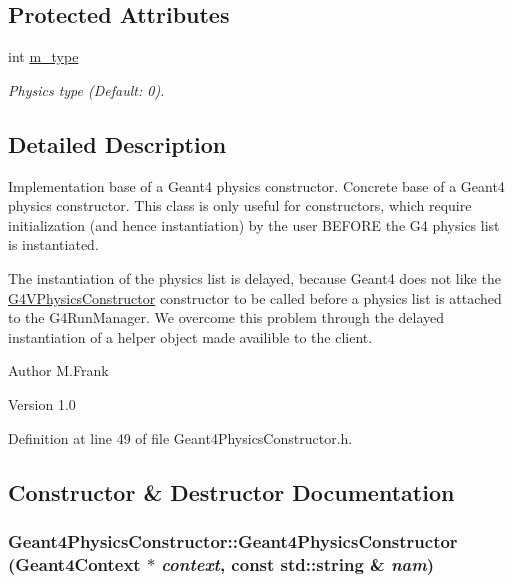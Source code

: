 \subsection*{Protected Attributes}
\begin{DoxyCompactItemize}
\item 
int \hyperlink{class_d_d4hep_1_1_simulation_1_1_geant4_physics_constructor_ac262f2205619b69465908a66dc16b296}{m\_\-type}
\begin{DoxyCompactList}\small\item\em Physics type (Default: 0). \item\end{DoxyCompactList}\end{DoxyCompactItemize}


\subsection{Detailed Description}
Implementation base of a Geant4 physics constructor. Concrete base of a Geant4 physics constructor. This class is only useful for constructors, which require initialization (and hence instantiation) by the user BEFORE the G4 physics list is instantiated.

The instantiation of the physics list is delayed, because Geant4 does not like the \hyperlink{class_g4_v_physics_constructor}{G4VPhysicsConstructor} constructor to be called before a physics list is attached to the G4RunManager. We overcome this problem through the delayed instantiation of a helper object made availible to the client.

\begin{DoxyAuthor}{Author}
M.Frank 
\end{DoxyAuthor}
\begin{DoxyVersion}{Version}
1.0 
\end{DoxyVersion}


Definition at line 49 of file Geant4PhysicsConstructor.h.

\subsection{Constructor \& Destructor Documentation}
\hypertarget{class_d_d4hep_1_1_simulation_1_1_geant4_physics_constructor_a64ea9fcabe64e3fe28ed25cf2e707e55}{
\subsubsection[{Geant4PhysicsConstructor}]{\setlength{\rightskip}{0pt plus 5cm}Geant4PhysicsConstructor::Geant4PhysicsConstructor ({\bf Geant4Context} $\ast$ {\em context}, \/  const std::string \& {\em nam})}}
\label{class_d_d4hep_1_1_simulation_1_1_geant4_physics_constructor_a64ea9fcabe64e3fe28ed25cf2e707e55}


